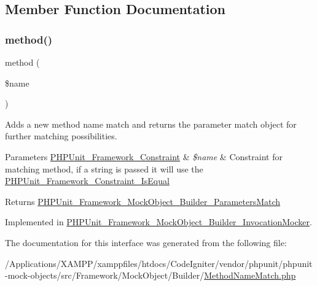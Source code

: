 \subsection{Member Function Documentation}
\mbox{\label{interface_p_h_p_unit___framework___mock_object___builder___method_name_match_ae552b7982aba3d16ddd35358fc3e8774}} 
\subsubsection{\texorpdfstring{method()}{method()}}
{\footnotesize\ttfamily method (\begin{DoxyParamCaption}\item[{}]{\$name }\end{DoxyParamCaption})}

Adds a new method name match and returns the parameter match object for further matching possibilities.


\begin{DoxyParams}[1]{Parameters}
\mbox{\hyperlink{class_p_h_p_unit___framework___constraint}{P\+H\+P\+Unit\+\_\+\+Framework\+\_\+\+Constraint}} & {\em \$name} & Constraint for matching method, if a string is passed it will use the \mbox{\hyperlink{class_p_h_p_unit___framework___constraint___is_equal}{P\+H\+P\+Unit\+\_\+\+Framework\+\_\+\+Constraint\+\_\+\+Is\+Equal}}\\
\hline
\end{DoxyParams}
\begin{DoxyReturn}{Returns}
\mbox{\hyperlink{interface_p_h_p_unit___framework___mock_object___builder___parameters_match}{P\+H\+P\+Unit\+\_\+\+Framework\+\_\+\+Mock\+Object\+\_\+\+Builder\+\_\+\+Parameters\+Match}} 
\end{DoxyReturn}


Implemented in \mbox{\hyperlink{class_p_h_p_unit___framework___mock_object___builder___invocation_mocker_a22d53bce8586e7eac1179dca52dfcd55}{P\+H\+P\+Unit\+\_\+\+Framework\+\_\+\+Mock\+Object\+\_\+\+Builder\+\_\+\+Invocation\+Mocker}}.



The documentation for this interface was generated from the following file\+:\begin{DoxyCompactItemize}
\item 
/\+Applications/\+X\+A\+M\+P\+P/xamppfiles/htdocs/\+Code\+Igniter/vendor/phpunit/phpunit-\/mock-\/objects/src/\+Framework/\+Mock\+Object/\+Builder/\mbox{\hyperlink{_method_name_match_8php}{Method\+Name\+Match.\+php}}\end{DoxyCompactItemize}
